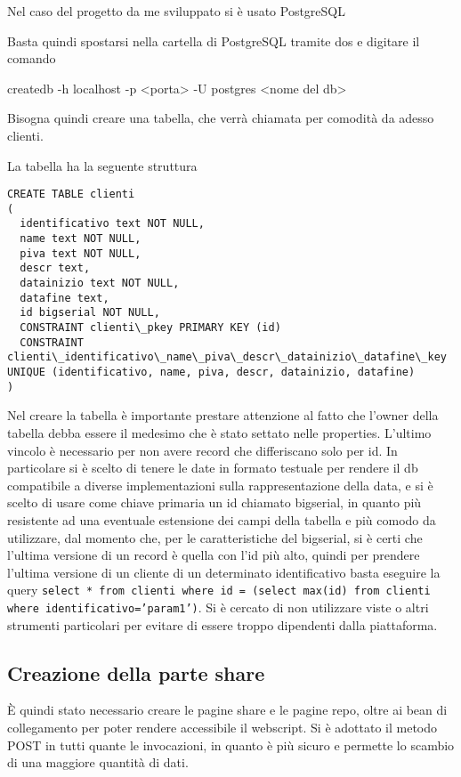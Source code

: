 Nel caso del progetto da me sviluppato si è usato PostgreSQL

Basta quindi spostarsi nella cartella di PostgreSQL tramite dos e digitare il comando

createdb -h localhost -p <porta> -U postgres <nome del db>

Bisogna quindi creare una tabella, che verrà chiamata per comodità da adesso clienti.

La tabella ha la seguente struttura 
\begin{lstlisting}
CREATE TABLE clienti
(
  identificativo text NOT NULL,
  name text NOT NULL,
  piva text NOT NULL,
  descr text,
  datainizio text NOT NULL,
  datafine text,
  id bigserial NOT NULL,
  CONSTRAINT clienti\_pkey PRIMARY KEY (id)
  CONSTRAINT clienti\_identificativo\_name\_piva\_descr\_datainizio\_datafine\_key UNIQUE (identificativo, name, piva, descr, datainizio, datafine)
)
\end{lstlisting}
Nel creare la tabella è importante prestare attenzione al fatto che l'owner della tabella debba essere il medesimo che è stato settato nelle properties.
L’ultimo vincolo è necessario per non avere record che differiscano solo per id.
In particolare si è scelto di tenere le date in formato testuale per rendere il db compatibile a diverse implementazioni sulla rappresentazione della data, e si è scelto di usare come chiave primaria un id chiamato bigserial, in quanto più resistente ad una eventuale estensione dei campi della tabella e più comodo da utilizzare, dal momento che, per le caratteristiche del bigserial, si è certi che l’ultima versione di un record è quella con l’id più alto, quindi per prendere l’ultima versione di un cliente di un determinato  identificativo basta eseguire la query \texttt{select * from clienti where id = (select max(id) from clienti where identificativo='param1')}. Si è cercato di non utilizzare viste o altri strumenti particolari per evitare di essere troppo dipendenti dalla piattaforma.



\subsection{Creazione della parte share}

È quindi stato necessario creare le pagine share e le pagine repo, oltre ai bean di collegamento per poter rendere accessibile il webscript. Si è adottato il metodo POST in tutti quante le invocazioni, in quanto è più sicuro e permette lo scambio di una maggiore quantità di dati.

